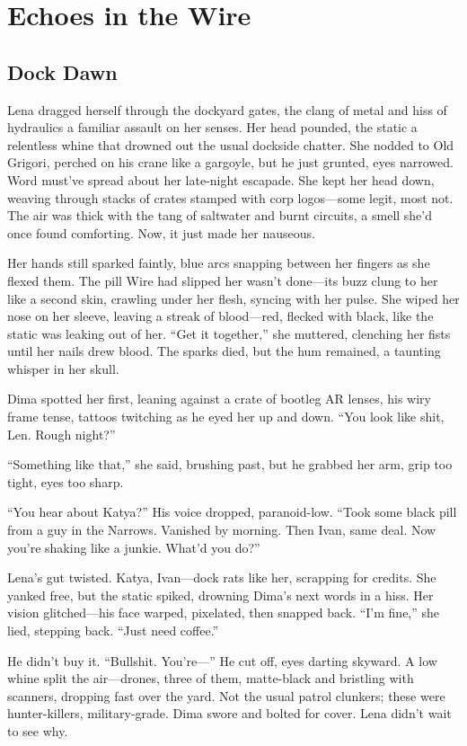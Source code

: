 \documentclass[12pt]{book}
\begin{document}
\chapter{Echoes in the Wire}
\section{Dock Dawn}

Lena dragged herself through the dockyard gates, the clang of metal and hiss of hydraulics a familiar assault on her senses. Her head pounded, the static a relentless whine that drowned out the usual dockside chatter. She nodded to Old Grigori, perched on his crane like a gargoyle, but he just grunted, eyes narrowed. Word must've spread about her late-night escapade. She kept her head down, weaving through stacks of crates stamped with corp logos---some legit, most not. The air was thick with the tang of saltwater and burnt circuits, a smell she'd once found comforting. Now, it just made her nauseous.

Her hands still sparked faintly, blue arcs snapping between her fingers as she flexed them. The pill Wire had slipped her wasn't done---its buzz clung to her like a second skin, crawling under her flesh, syncing with her pulse. She wiped her nose on her sleeve, leaving a streak of blood---red, flecked with black, like the static was leaking out of her. ``Get it together,'' she muttered, clenching her fists until her nails drew blood. The sparks died, but the hum remained, a taunting whisper in her skull.

Dima spotted her first, leaning against a crate of bootleg AR lenses, his wiry frame tense, tattoos twitching as he eyed her up and down. ``You look like shit, Len. Rough night?''

``Something like that,'' she said, brushing past, but he grabbed her arm, grip too tight, eyes too sharp.

``You hear about Katya?'' His voice dropped, paranoid-low. ``Took some black pill from a guy in the Narrows. Vanished by morning. Then Ivan, same deal. Now you're shaking like a junkie. What'd you do?''

Lena's gut twisted. Katya, Ivan---dock rats like her, scrapping for credits. She yanked free, but the static spiked, drowning Dima's next words in a hiss. Her vision glitched---his face warped, pixelated, then snapped back. ``I'm fine,'' she lied, stepping back. ``Just need coffee.''

He didn't buy it. ``Bullshit. You're---'' He cut off, eyes darting skyward. A low whine split the air---drones, three of them, matte-black and bristling with scanners, dropping fast over the yard. Not the usual patrol clunkers; these were hunter-killers, military-grade. Dima swore and bolted for cover. Lena didn't wait to see why.
\end{document}
